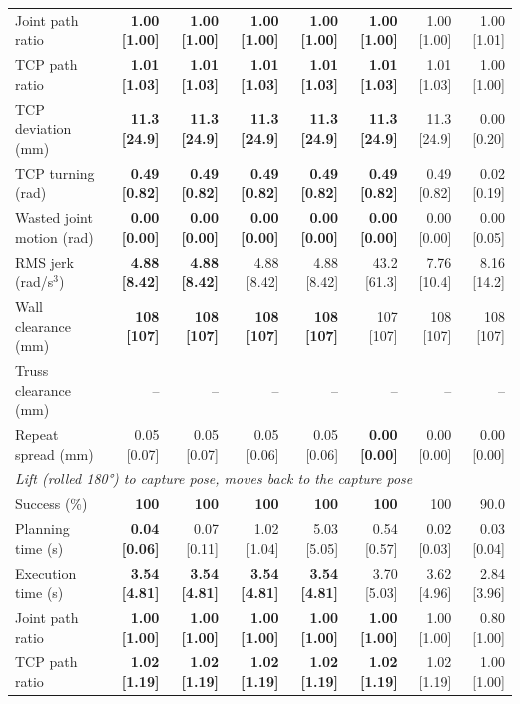 \begin{table}[t]
\begin{tabular}{lrrrrrrr}
Joint path ratio & \textbf{1.00 [1.00]} & \textbf{1.00 [1.00]} & \textbf{1.00 [1.00]} & \textbf{1.00 [1.00]} & \textbf{1.00 [1.00]} & 1.00 [1.00] & 1.00 [1.01] \\
TCP path ratio & \textbf{1.01 [1.03]} & \textbf{1.01 [1.03]} & \textbf{1.01 [1.03]} & \textbf{1.01 [1.03]} & \textbf{1.01 [1.03]} & 1.01 [1.03] & 1.00 [1.00] \\
TCP deviation (mm) & \textbf{11.3 [24.9]} & \textbf{11.3 [24.9]} & \textbf{11.3 [24.9]} & \textbf{11.3 [24.9]} & \textbf{11.3 [24.9]} & 11.3 [24.9] & 0.00 [0.20] \\
TCP turning (rad) & \textbf{0.49 [0.82]} & \textbf{0.49 [0.82]} & \textbf{0.49 [0.82]} & \textbf{0.49 [0.82]} & \textbf{0.49 [0.82]} & 0.49 [0.82] & 0.02 [0.19] \\
Wasted joint motion (rad) & \textbf{0.00 [0.00]} & \textbf{0.00 [0.00]} & \textbf{0.00 [0.00]} & \textbf{0.00 [0.00]} & \textbf{0.00 [0.00]} & 0.00 [0.00] & 0.00 [0.05] \\
RMS jerk (rad/s$^3$) & \textbf{4.88 [8.42]} & \textbf{4.88 [8.42]} & 4.88 [8.42] & 4.88 [8.42] & 43.2 [61.3] & 7.76 [10.4] & 8.16 [14.2] \\
Wall clearance (mm) & \textbf{108 [107]} & \textbf{108 [107]} & \textbf{108 [107]} & \textbf{108 [107]} & 107 [107] & 108 [107] & 108 [107] \\
Truss clearance (mm) & -- & -- & -- & -- & -- & -- & -- \\
Repeat spread (mm) & 0.05 [0.07] & 0.05 [0.07] & 0.05 [0.06] & 0.05 [0.06] & \textbf{0.00 [0.00]} & 0.00 [0.00] & 0.00 [0.00] \\
\midrule
\multicolumn{8}{l}{\emph{Lift (rolled 180°) to capture pose, moves back to the capture pose}} \\
Success (\%) & \textbf{100} & \textbf{100} & \textbf{100} & \textbf{100} & \textbf{100} & 100 & 90.0 \\
Planning time (s) & \textbf{0.04 [0.06]} & 0.07 [0.11] & 1.02 [1.04] & 5.03 [5.05] & 0.54 [0.57] & 0.02 [0.03] & 0.03 [0.04] \\
Execution time (s) & \textbf{3.54 [4.81]} & \textbf{3.54 [4.81]} & \textbf{3.54 [4.81]} & \textbf{3.54 [4.81]} & 3.70 [5.03] & 3.62 [4.96] & 2.84 [3.96] \\
Joint path ratio & \textbf{1.00 [1.00]} & \textbf{1.00 [1.00]} & \textbf{1.00 [1.00]} & \textbf{1.00 [1.00]} & \textbf{1.00 [1.00]} & 1.00 [1.00] & 0.80 [1.00] \\
TCP path ratio & \textbf{1.02 [1.19]} & \textbf{1.02 [1.19]} & \textbf{1.02 [1.19]} & \textbf{1.02 [1.19]} & \textbf{1.02 [1.19]} & 1.02 [1.19] & 1.00 [1.00] \\

\end{tabular}
\end{table}
